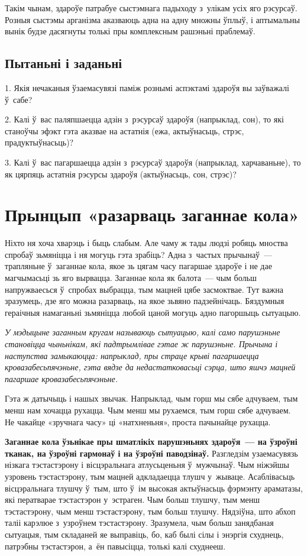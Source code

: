 Такім чынам, здароўе патрабуе сыстэмнага падыходу з~улікам усіх яго рэсурсаў. Розныя сыстэмы арганізма аказваюць адна на адну множны ўплыў, і аптымальны вынік будзе дасягнуты толькі пры комплексным рашэньні праблемаў.

\subsection*{Пытаньні і заданьні}

1. Якія нечаканыя ўзаемасувязі паміж рознымі аспэктамі здароўя вы заўважалі ў~сабе?

2. Калі ў~вас паляпшаецца адзін з~рэсурсаў здароўя (напрыклад, сон), то які станоўчы эфэкт гэта аказвае на астатнія (ежа, актыўнасьць, стрэс, прадуктыўнасьць)?

3. Калі ў~вас пагаршаецца адзін з~рэсурсаў здароўя (напрыклад, харчаваньне), то як цярпяць астатнія рэсурсы здароўя (актыўнасьць, сон, стрэс)?


\section{Прынцып «разарваць заганнае кола»}

Ніхто ня хоча хварэць і быць слабым. Але чаму ж тады людзі робяць мноства спробаў зьмяніцца і ня могуць гэта зрабіць? Адна з~частых прычынаў~--- трапляньне ў~заганнае кола, якое зь цягам часу пагаршае здароўе і не дае магчымасьці зь яго вырвацца. Заганнае кола як балота~--- чым больш напружваесься ў~спробах выбрацца, тым мацней цябе засмоктвае. Тут важна зразумець, дзе яго можна разарваць, на якое зьвяно падзейнічаць. Бяздумныя гераічныя намаганьні зьмяніцца любой цаной могуць адно пагоршыць сытуацыю.

\emph{У мэдыцыне заганным кругам называюць сытуацыю, калі само парушэньне становіцца чыньнікам, які падтрымлівае гэтае ж парушэньне. Прычына і наступства замыкаюцца: напрыклад, пры страце крыві пагаршаецца кровазабесьпячэньне, гэта вядзе да недастатковасьці сэрца, што яшчэ мацней пагаршае кровазабесьпячэньне.}

Гэта ж датычыць і нашых звычак. Напрыклад, чым горш мы сябе адчуваем, тым менш нам хочацца рухацца. Чым менш мы рухаемся, тым горш сябе адчуваем. Не чакайце «зручнага часу» ці «натхненьня», проста пачынайце рухацца.

\textbf{Заганнае кола ўзьнікае пры шматлікіх парушэньнях здароўя~--- на ўзроўні тканак, на ўзроўні гармонаў і на ўзроўні паводзінаў.} Разгледзім узаемасувязь нізкага тэстастэрону і вісцэральнага атлусьценьня ў~мужчынаў. Чым ніжэйшы узровень тэстастэрону, тым мацней адкладаецца тлушч у~жываце. Асаблівасьць вісцэральнага тлушчу ў~тым, што ў~ім высокая актыўнасьць фэрмэнту араматазы, які ператварае тэстастэрон у~эстраген. Чым больш тлушчу, тым менш тэстастэрону, чым менш тэстастэрону, тым больш тлушчу. Нядзіўна, што абхоп таліі карэлюе з~узроўнем тэстастэрону. Зразумела, чым больш занядбаная сытуацыя, тым складаней яе выправіць, бо, каб былі сілы і энэргія схуднець, патрэбны тэстастэрон, а~ён павысіцца, толькі калі схуднееш.

